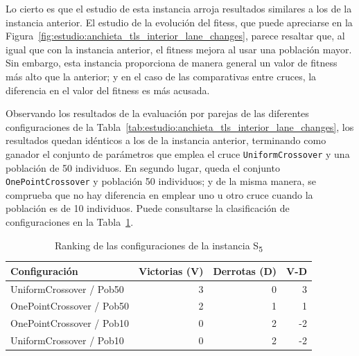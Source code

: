 Lo cierto es que el estudio de esta instancia arroja resultados similares a los de la instancia anterior. El estudio de la evolución del fitess, que puede apreciarse en la Figura~\ref{fig:estudio:anchieta_tls_interior_lane_changes}, parece resaltar que, al igual que con la instancia anterior, el fitness mejora al usar una población mayor. Sin embargo, esta instancia proporciona de manera general un valor de fitness más alto que la anterior; y en el caso de las comparativas entre cruces, la diferencia en el valor del fitness es más acusada.

Observando los resultados de la evaluación por parejas de las diferentes configuraciones de la Tabla~\ref{tab:estudio:anchieta_tls_interior_lane_changes}, los resultados quedan idénticos a los de la instancia anterior, terminando como ganador el conjunto de parámetros que emplea el cruce \texttt{UniformCrossover} y una población de 50 individuos. En segundo lugar, queda el conjunto \texttt{OnePointCrossover} y población 50 individuos; y de la misma manera, se comprueba que no hay diferencia en emplear uno u otro cruce cuando la población es de 10 individuos. Puede consultarse la clasificación de configuraciones en la Tabla~\ref{tab:rankingS5}.

\begin{table}[h]
\centering
\caption{Ranking de las configuraciones de la instancia S\textsubscript{5}}
\label{tab:rankingS5}
\begin{tabular}{lrrr}
\hline
\multicolumn{1}{l}{\textbf{Configuración}} & \textbf{Victorias (V)} & \textbf{Derrotas (D)} & \textbf{V-D} \\ \hline
UniformCrossover / Pob50                   & 3                      & 0                     & 3            \\ \hline
OnePointCrossover / Pob50                  & 2                      & 1                     & 1            \\ \hline
OnePointCrossover / Pob10                  & 0                      & 2                     & -2           \\ \hline
UniformCrossover / Pob10                   & 0                      & 2                     & -2           \\ \hline
\end{tabular}
\end{table}


